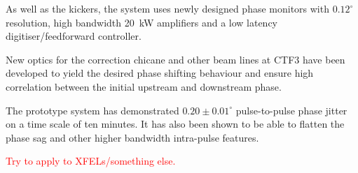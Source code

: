\documentclass[%
 reprint,
 amsmath,amssymb,
 prl,
]{revtex4-1}
\begin{document}
As 
well as the kickers, the system uses newly designed phase monitors with 
\(0.12^\circ\) resolution, high bandwidth 20~kW amplifiers and a low latency 
digitiser/feedforward controller. %

New optics for the correction chicane and other beam lines at CTF3 have been 
developed to yield the desired phase shifting behaviour and ensure high 
correlation between the initial upstream and downstream phase.

The prototype system has demonstrated \(0.20\pm0.01^\circ\) pulse-to-pulse 
phase jitter on a time scale of ten minutes. It has also been shown to be able 
to flatten the phase sag and other higher bandwidth intra-pulse features.


\textcolor{red}{Try to apply to XFELs/something else.}

\end{document}
